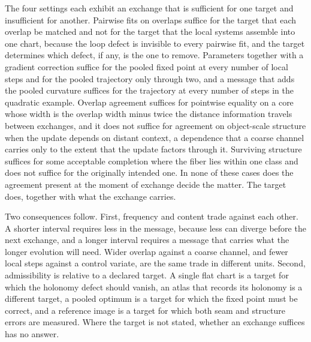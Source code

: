 \documentclass[11pt]{article}
\theoremstyle{definition}
\theoremstyle{plain}
\theoremstyle{remark}
\begin{document}
The four settings each exhibit an exchange that is sufficient for one target and insufficient for another. Pairwise fits on overlaps suffice for the target that each overlap be matched and not for the target that the local systems assemble into one chart, because the loop defect is invisible to every pairwise fit, and the target determines which defect, if any, is the one to remove. Parameters together with a gradient correction suffice for the pooled fixed point at every number of local steps and for the pooled trajectory only through two, and a message that adds the pooled curvature suffices for the trajectory at every number of steps in the quadratic example. Overlap agreement suffices for pointwise equality on a core whose width is the overlap width minus twice the distance information travels between exchanges, and it does not suffice for agreement on object-scale structure when the update depends on distant context, a dependence that a coarse channel carries only to the extent that the update factors through it. Surviving structure suffices for some acceptable completion where the fiber lies within one class and does not suffice for the originally intended one. In none of these cases does the agreement present at the moment of exchange decide the matter. The target does, together with what the exchange carries.

Two consequences follow. First, frequency and content trade against each other. A shorter interval requires less in the message, because less can diverge before the next exchange, and a longer interval requires a message that carries what the longer evolution will need. Wider overlap against a coarse channel, and fewer local steps against a control variate, are the same trade in different units. Second, admissibility is relative to a declared target. A single flat chart is a target for which the holonomy defect should vanish, an atlas that records its holonomy is a different target, a pooled optimum is a target for which the fixed point must be correct, and a reference image is a target for which both seam and structure errors are measured. Where the target is not stated, whether an exchange suffices has no answer.
\end{document}
